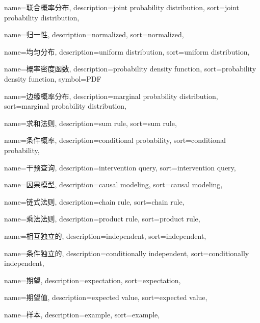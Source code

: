 {
  name=联合概率分布,
  description={joint probability distribution},
  sort={joint probability distribution},
}

{
  name=归一性,
  description={normalized},
  sort={normalized},
}

{
  name=均匀分布,
  description={uniform distribution},
  sort={uniform distribution},
}

{
  name=概率密度函数,
  description={probability density function},
  sort={probability density function},
  symbol={PDF}
}

{
  name=边缘概率分布,
  description={marginal probability distribution},
  sort={marginal probability distribution},
}

{
  name=求和法则,
  description={sum rule},
  sort={sum rule},
}

{
  name=条件概率,
  description={conditional probability},
  sort={conditional probability},
}

{
  name=干预查询,
  description={intervention query},
  sort={intervention query},
}

{
  name=因果模型,
  description={causal modeling},
  sort={causal modeling},
}

{
  name=链式法则,
  description={chain rule},
  sort={chain rule},
}

{
  name=乘法法则,
  description={product rule},
  sort={product rule},
}

{
  name=相互独立的,
  description={independent},
  sort={independent},
}

{
  name=条件独立的,
  description={conditionally independent},
  sort={conditionally independent},
}

{
  name=期望,
  description={expectation},
  sort={expectation},
}

{
  name=期望值,
  description={expected value},
  sort={expected value},
}

{
  name=样本,
  description={example},
  sort={example},
}

